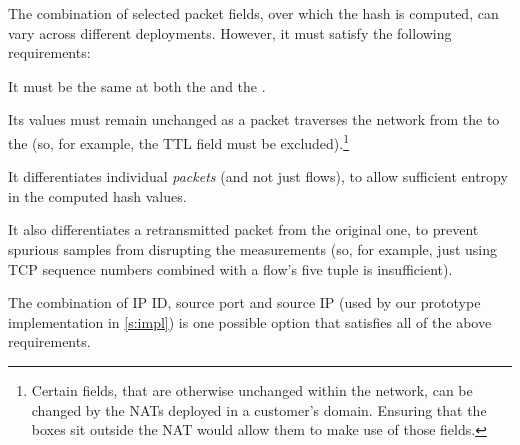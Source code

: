 

The combination of selected packet fields, over which the hash is computed, can vary across different deployments. However, it must satisfy the following requirements: 

 It must be the same at both the \inbox and the \outbox.

 Its values must remain unchanged as a packet traverses the network from the \inbox to the \outbox (so, for example, the TTL field must be excluded).\footnote{Certain fields, that are otherwise unchanged within the network, can be changed by the NATs deployed in a customer's domain. Ensuring that the \name boxes sit outside the NAT would allow them to make use of those fields.} 

 It differentiates individual \emph{packets} (and not just flows), to allow sufficient entropy in the computed hash values.

 It also differentiates a retransmitted packet from the original one, to prevent spurious samples from disrupting the measurements (so, for example, just using TCP sequence numbers combined with a flow's five tuple is insufficient).

The combination of IP ID, source port and source IP (used by our prototype implementation in \ref{s:impl}) is one possible option that satisfies all of the above requirements.  

